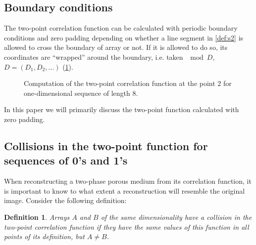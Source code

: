 \documentclass[12pt, a4paper]{article}
\newtheorem{definition}{Definition}
\begin{document}
\subsection{Boundary conditions}
The two-point correlation function can be calculated with periodic boundary
conditions and zero padding depending on whether a line segment in
\cref{def:s2} is allowed to cross the boundary of array or not. If it is allowed
to do so, its coordinates are ``wrapped'' around the boundary, i.e. taken
$\mod D$, $D = (D_1, D_2, \dots)$ (\cref{fig:s2-computation}).
\begin{figure}[tp]
  \centering
  \hfill
  \caption[]{Computation of the two-point correlation function at the point $2$
    for one-dimensional sequence of length 8.}
  \label{fig:s2-computation}
\end{figure}

In this paper we will primarily discuss the two-point function calculated with
zero padding.

\subsection{Collisions in the two-point function for sequences of 0's and 1's}
When reconstructing a two-phase porous medium from its correlation function, it
is important to know to what extent a reconstruction will resemble the original
image. Consider the following definition:
\begin{definition}
  Arrays $A$ and $B$ of the same dimensionality have a collision in the
  two-point correlation function if they have the same values of this function
  in all points of its definition, but $A \ne B$.
\end{definition}
\end{document}
